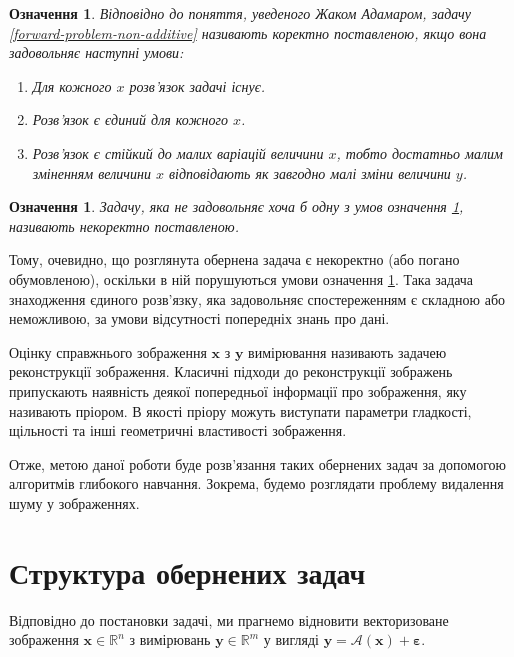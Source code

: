 \documentclass[14pt,a4paper]{extarticle}
\newcounter{e}
\newtheorem{defn}[theorem]{Означення}
\numberwithin{equation}{section}
\numberwithin{figure}{section}
\begin{document}
	\begin{defn}
		\label{well-posed}
		Відповідно до поняття, уведеного Жаком Адамаром, задачу \ref{forward-problem-non-additive} називають коректно поставленою, якщо вона задовольняє наступні умови: 
		\begin{enumerate}
			\item Для кожного $x$ розв'язок задачі існує.
			\item Розв'язок є єдиний для кожного $x$.
			\item Розв'язок є стійкий до малих варіацій величини $x$, тобто достатньо малим зміненням величини $x$ відповідають як завгодно малі зміни величини $y$.
		\end{enumerate}
	\end{defn}

	\begin{defn}
		\label{ill-posed}	
		Задачу, яка не задовольняє хоча б одну з умов означення \ref{well-posed}, називають некоректно поставленою.
	\end{defn}

	Тому, очевидно, що розглянута обернена задача є некоректно (або погано обумовленою), оскільки в ній порушуються умови означення \ref{well-posed}. Така задача знаходження єдиного розв'язку, яка задовольняє спостереженням є складною або неможливою, за умови відсутності попередніх знань про дані.

	Оцінку справжнього зображення $\boldsymbol{x}$ з $\boldsymbol{y}$  вимірювання називають задачею реконструкції зображення. Класичні підходи до реконструкції зображень припускають наявність деякої попередньої інформації про зображення, яку називають пріором. В якості пріору можуть виступати параметри гладкості, щільності та інші геометричні властивості зображення.

	Отже, метою даної роботи буде розв'язання таких обернених задач за допомогою алгоритмів глибокого навчання. Зокрема, будемо розглядати проблему видалення шуму у зображеннях.

	\newpage
	\thispagestyle{empty}
	\section{Структура обернених задач}

	Відповідно до постановки задачі, ми прагнемо відновити векторизоване зображення $\boldsymbol{x} \in \mathbb{R}^{n}$ з вимірювань $\boldsymbol{y} \in \mathbb{R}^{m}$ у вигляді $\boldsymbol{y}=\mathcal{A}\left(\boldsymbol{x}\right)+\boldsymbol{\varepsilon}$.
\end{document}
